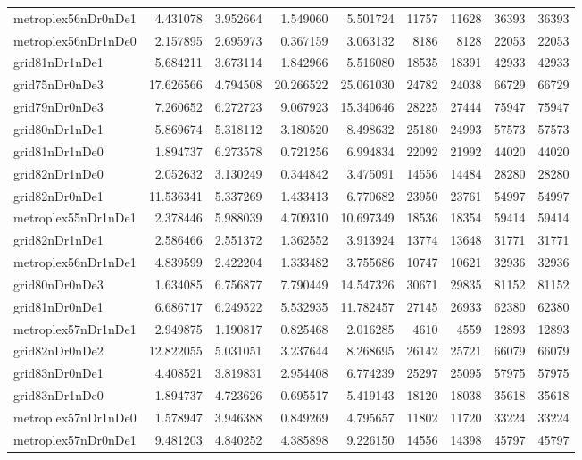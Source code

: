 \begin{longtable}{|l|r|r|r|r|r|r|r|r|}
metroplex56nDr0nDe1 & 4.431078 & 3.952664 & 1.549060 & 5.501724 & 11757 & 11628 & 36393 & 36393 \\
metroplex56nDr1nDe0 & 2.157895 & 2.695973 & 0.367159 & 3.063132 & 8186 & 8128 & 22053 & 22053 \\
grid81nDr1nDe1 & 5.684211 & 3.673114 & 1.842966 & 5.516080 & 18535 & 18391 & 42933 & 42933 \\
grid75nDr0nDe3 & 17.626566 & 4.794508 & 20.266522 & 25.061030 & 24782 & 24038 & 66729 & 66729 \\
grid79nDr0nDe3 & 7.260652 & 6.272723 & 9.067923 & 15.340646 & 28225 & 27444 & 75947 & 75947 \\
grid80nDr1nDe1 & 5.869674 & 5.318112 & 3.180520 & 8.498632 & 25180 & 24993 & 57573 & 57573 \\
grid81nDr1nDe0 & 1.894737 & 6.273578 & 0.721256 & 6.994834 & 22092 & 21992 & 44020 & 44020 \\
grid82nDr1nDe0 & 2.052632 & 3.130249 & 0.344842 & 3.475091 & 14556 & 14484 & 28280 & 28280 \\
grid82nDr0nDe1 & 11.536341 & 5.337269 & 1.433413 & 6.770682 & 23950 & 23761 & 54997 & 54997 \\
metroplex55nDr1nDe1 & 2.378446 & 5.988039 & 4.709310 & 10.697349 & 18536 & 18354 & 59414 & 59414 \\
grid82nDr1nDe1 & 2.586466 & 2.551372 & 1.362552 & 3.913924 & 13774 & 13648 & 31771 & 31771 \\
metroplex56nDr1nDe1 & 4.839599 & 2.422204 & 1.333482 & 3.755686 & 10747 & 10621 & 32936 & 32936 \\
grid80nDr0nDe3 & 1.634085 & 6.756877 & 7.790449 & 14.547326 & 30671 & 29835 & 81152 & 81152 \\
grid81nDr0nDe1 & 6.686717 & 6.249522 & 5.532935 & 11.782457 & 27145 & 26933 & 62380 & 62380 \\
metroplex57nDr1nDe1 & 2.949875 & 1.190817 & 0.825468 & 2.016285 & 4610 & 4559 & 12893 & 12893 \\
grid82nDr0nDe2 & 12.822055 & 5.031051 & 3.237644 & 8.268695 & 26142 & 25721 & 66079 & 66079 \\
grid83nDr0nDe1 & 4.408521 & 3.819831 & 2.954408 & 6.774239 & 25297 & 25095 & 57975 & 57975 \\
grid83nDr1nDe0 & 1.894737 & 4.723626 & 0.695517 & 5.419143 & 18120 & 18038 & 35618 & 35618 \\
metroplex57nDr1nDe0 & 1.578947 & 3.946388 & 0.849269 & 4.795657 & 11802 & 11720 & 33224 & 33224 \\
metroplex57nDr0nDe1 & 9.481203 & 4.840252 & 4.385898 & 9.226150 & 14556 & 14398 & 45797 & 45797 \\

\end{longtable}
